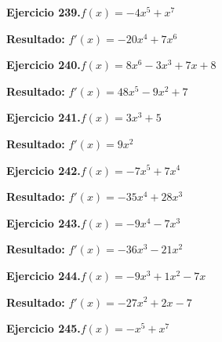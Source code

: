 \documentclass[10pt,a4paper]{article}
\begin{document}
\begin{ejbox}
\textbf{Ejercicio 239.}\quad $f(x) = -4x^{5} + x^{7}$
\end{ejbox}

\begin{solbox}
\textbf{Resultado:} \(\displaystyle f'(x) = -20x^{4} + 7x^{6}\)
\end{solbox}

\begin{ejbox}
\textbf{Ejercicio 240.}\quad $f(x) = 8x^{6} -3x^{3} +7x +8$
\end{ejbox}

\begin{solbox}
\textbf{Resultado:} \(\displaystyle f'(x) = 48x^{5} -9x^{2} +7\)
\end{solbox}

\newpage
\begin{ejbox}
\textbf{Ejercicio 241.}\quad $f(x) = 3x^{3} +5$
\end{ejbox}

\begin{solbox}
\textbf{Resultado:} \(\displaystyle f'(x) = 9x^{2}\)
\end{solbox}

\begin{ejbox}
\textbf{Ejercicio 242.}\quad $f(x) = -7x^{5} + 7x^{4}$
\end{ejbox}

\begin{solbox}
\textbf{Resultado:} \(\displaystyle f'(x) = -35x^{4} + 28x^{3}\)
\end{solbox}

\begin{ejbox}
\textbf{Ejercicio 243.}\quad $f(x) = -9x^{4} -7x^{3}$
\end{ejbox}

\begin{solbox}
\textbf{Resultado:} \(\displaystyle f'(x) = -36x^{3} -21x^{2}\)
\end{solbox}

\newpage
\begin{ejbox}
\textbf{Ejercicio 244.}\quad $f(x) = -9x^3 +1x^2 -7x$
\end{ejbox}

\begin{solbox}
\textbf{Resultado:} \(\displaystyle f'(x) = -27x^2 +2x -7\)
\end{solbox}

\begin{ejbox}
\textbf{Ejercicio 245.}\quad $f(x) = -x^{5} + x^{7}$
\end{ejbox}
\end{document}
